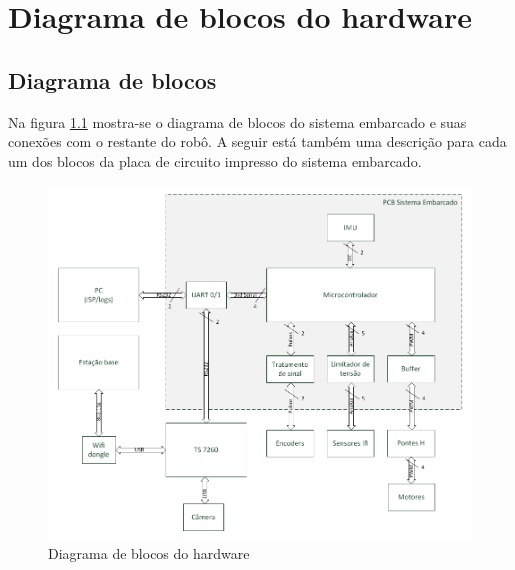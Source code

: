 
\chapter{Diagrama de blocos do hardware}

\section{Diagrama de blocos}

Na figura \ref{fig:diagrama_blocos_hardware} mostra-se o diagrama de blocos do sistema embarcado e suas conexões com o restante do robô. A seguir está também uma descrição para cada um dos blocos da placa de circuito impresso do sistema embarcado.

\begin{figure}[htpb!]
  \centering
  \includegraphics[width=\textwidth]{./figuras/diagrama_blocos_hardware.png}
  \caption{Diagrama de blocos do hardware}
  \label{fig:diagrama_blocos_hardware}
\end{figure}


